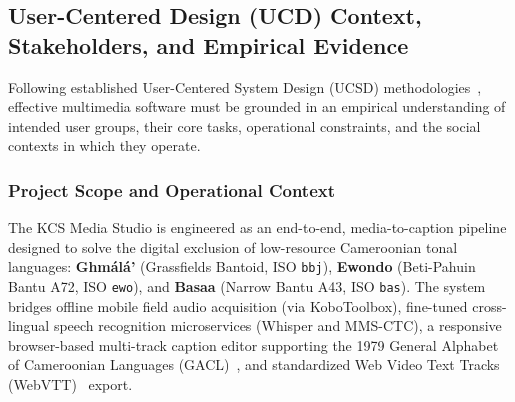 \documentclass[conference]{IEEEtran}
\begin{document}
\subsection{User-Centered Design (UCD) Context, Stakeholders, and Empirical Evidence}
\label{sec:design:ucd}

Following established User-Centered System Design (UCSD) methodologies~\cite{norman1986user}, effective multimedia software must be grounded in an empirical understanding of intended user groups, their core tasks, operational constraints, and the social contexts in which they operate. 

\subsubsection{Project Scope and Operational Context}
\label{sec:design:ucd:scope}
The KCS Media Studio is engineered as an end-to-end, media-to-caption pipeline designed to solve the digital exclusion of low-resource Cameroonian tonal languages: \textbf{Gh\textopeno m\'al\'a'} (Grassfields Bantoid, ISO \texttt{bbj}), \textbf{Ewondo} (Beti-Pahuin Bantu A72, ISO \texttt{ewo}), and \textbf{Basaa} (Narrow Bantu A43, ISO \texttt{bas}). The system bridges offline mobile field audio acquisition (via KoboToolbox), fine-tuned cross-lingual speech recognition microservices (Whisper and MMS-CTC), a responsive browser-based multi-track caption editor supporting the 1979 General Alphabet of Cameroonian Languages (GACL)~\cite{tadadjeu1979alphabet}, and standardized Web Video Text Tracks (WebVTT)~\cite{w3c2019webvtt} export.
\end{document}
